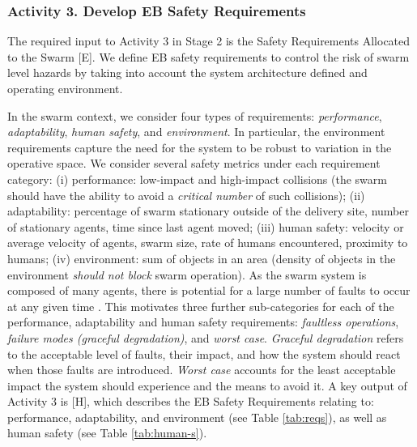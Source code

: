 \documentclass[runningheads]{llncs}
\begin{document}
\subsubsection*{Activity 3. Develop EB Safety Requirements}

The required input to Activity 3 in Stage 2 is the Safety Requirements Allocated to the Swarm [E]. 
We define EB safety requirements to control the risk of swarm level hazards by taking into account the system architecture defined and operating environment. 

In the swarm context, we consider four types of requirements: \emph{performance}, \emph{adaptability}, \emph{human safety}, and \emph{environment}. 
In particular, the environment requirements capture the need for the system to be robust to variation in the operative space.
We consider several safety metrics under each requirement category: 
(i) performance: low-impact and high-impact collisions (the swarm should have the ability to avoid a \emph{critical number} of such collisions); 
(ii) adaptability: percentage of swarm stationary outside of the delivery site, number of stationary agents, time since last agent moved; 
(iii) human safety: velocity or average velocity of agents, swarm size, rate of humans encountered, proximity to humans;
(iv) environment: sum of objects in an area (density of objects in the environment \emph{should not block} swarm operation).
As the swarm system is composed of many agents, there is potential for a large number of faults to occur at any given time \cite{Lee2022}. This motivates three further sub-categories for each of the performance, adaptability and human safety requirements: \emph{faultless operations}, \emph{failure modes (graceful degradation)}, and \emph{worst case}. 
\emph{Graceful degradation} refers to the acceptable level of faults, their impact, and how the system should react when those faults are introduced. \emph{Worst case} accounts for the least acceptable impact the system should experience and the means to avoid it. 
A key output of Activity 3 is [H], which describes the EB Safety Requirements relating to: performance, adaptability, and environment (see Table \ref{tab:reqs}), as well as human safety (see Table \ref{tab:human-s}).
\end{document}

